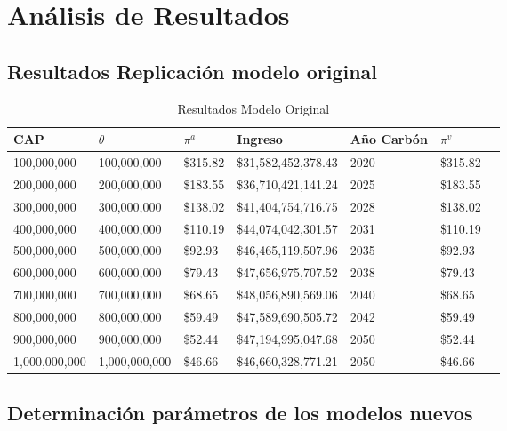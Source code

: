 
\chapter{Análisis de Resultados}
\label{c4} %


\section{Resultados Replicación modelo original}\label{replicaciongams}

\begin{table}[H]
    \centering
    \begin{tabular}{|l|l|l|l|l|l|l|}
    \hline
        CAP &  $\theta$ & $\pi^a$ & Ingreso &  Año Carbón & $ \pi^v$   \\ \hline
        100,000,000  & 100,000,000  &  \$315.82  &  \$31,582,452,378.43  & 2020 &  \$315.82   \\ \hline
        200,000,000  & 200,000,000  &  \$183.55  &  \$36,710,421,141.24  & 2025 &  \$183.55   \\ \hline
        300,000,000  & 300,000,000  &  \$138.02  &  \$41,404,754,716.75  & 2028 &  \$138.02   \\ \hline
        400,000,000  & 400,000,000  &  \$110.19  &  \$44,074,042,301.57  & 2031 &  \$110.19   \\ \hline
        500,000,000  & 500,000,000  &  \$92.93  &  \$46,465,119,507.96  & 2035 &  \$92.93   \\ \hline
        600,000,000  & 600,000,000  &  \$79.43  &  \$47,656,975,707.52  & 2038 &  \$79.43   \\ \hline
        700,000,000  & 700,000,000  &  \$68.65  &  \$48,056,890,569.06  & 2040 &  \$68.65   \\ \hline
        800,000,000  & 800,000,000  &  \$59.49  &  \$47,589,690,505.72  & 2042 &  \$59.49   \\ \hline
        900,000,000  & 900,000,000  &  \$52.44  &  \$47,194,995,047.68  & 2050 &  \$52.44   \\ \hline
        1,000,000,000  & 1,000,000,000  &  \$46.66  &  \$46,660,328,771.21  & 2050 &  \$46.66   \\ \hline
    \end{tabular}
    \caption{{\footnotesize Resultados Modelo Original}}
    \label{resultadosmodelooriginal}
\end{table}

\section{Determinación parámetros de los modelos nuevos}\label{introresultados}


